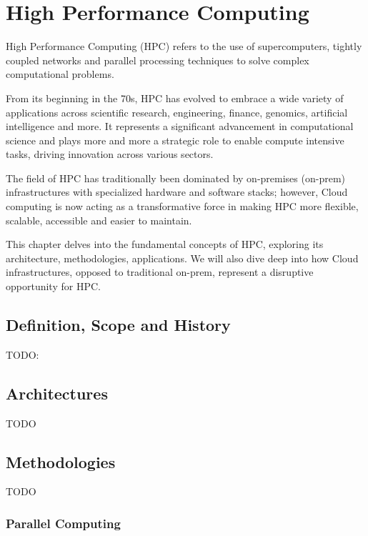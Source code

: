 \chapter{High Performance Computing}

High Performance Computing (HPC) refers to the use of supercomputers, tightly coupled networks and parallel
processing techniques to solve complex computational problems.

From its beginning in the 70s, HPC has evolved to embrace a wide variety of applications across scientific
research, engineering, finance, genomics, artificial intelligence and more.
It represents a significant advancement in computational science and plays more and more a strategic role to
enable compute intensive tasks, driving innovation across various sectors.

The field of HPC has traditionally been dominated by on-premises (on-prem) infrastructures with specialized
hardware and software stacks; however, Cloud computing is now acting as a transformative force in making HPC
more flexible, scalable, accessible and easier to maintain.

This chapter delves into the fundamental concepts of HPC, exploring its architecture, methodologies,
applications. We will also dive deep into how Cloud infrastructures, opposed to traditional on-prem,
represent a disruptive opportunity for HPC.

\section{Definition, Scope and History}
\label{sec:definition-scope-and-history}

TODO:~\cite{MythsLegendsHpc2023}

\section{Architectures}
\label{sec:architectures}

TODO

\section{Methodologies}
\label{sec:methodologies}

TODO

\subsection{Parallel Computing}
\label{ssec:parallel-computing}

